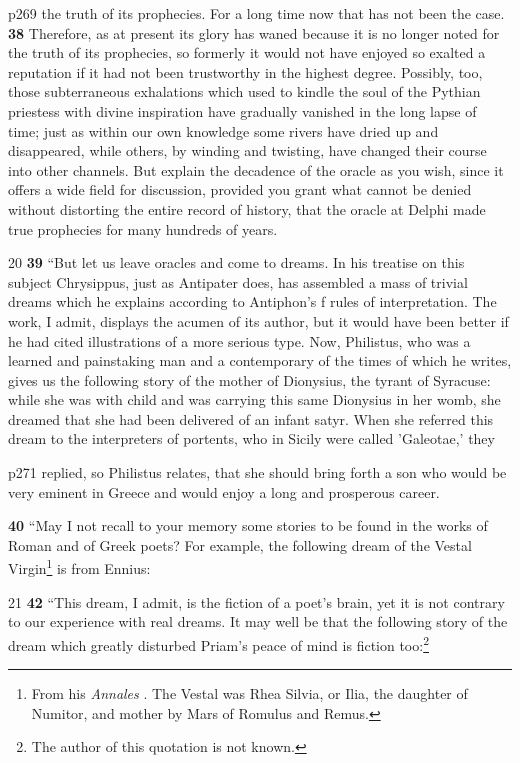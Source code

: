p269 the truth of its prophecies. For a long time now that has not been the case. \textbf{38} Therefore, as at present its glory has waned because it is no longer noted for the truth of its prophecies, so formerly it would not have enjoyed so exalted a reputation if it had not been trustworthy in the highest degree. Possibly, too, those subterraneous exhalations which used to kindle the soul of the Pythian priestess with divine inspiration have gradually vanished in the long lapse of time; just as within our own knowledge some rivers have dried up and disappeared, while others, by winding and twisting, have changed their course into other channels. But explain the decadence of the oracle as you wish, since it offers a wide field for discussion, provided you grant what cannot be denied without distorting the entire record of history, that the oracle at Delphi made true prophecies for many hundreds of years.

20
\textbf{39} ``But let us leave oracles and come to dreams. In his treatise on this subject Chrysippus, just as Antipater does, has assembled a mass of trivial dreams which he explains according to Antiphon's\texthebrew{} f rules of interpretation. The work, I admit, displays the acumen of its author, but it would have been better if he had cited illustrations of a more serious type. Now, Philistus, who was a learned and painstaking man and a contemporary of the times of which he writes, gives us the following story of the mother of Dionysius, the tyrant of Syracuse: while she was with child and was carrying this same Dionysius in her womb, she dreamed that she had been delivered of an infant satyr. When she referred this dream to the interpreters of portents, who in Sicily were called 'Galeotae,' they

p271 replied, so Philistus relates, that she should bring forth a son who would be very eminent in Greece and would enjoy a long and prosperous career.

\textbf{40} ``May I not recall to your memory some stories to be found in the works of Roman and of Greek poets? For example, the following dream of the Vestal Virgin\texthebrew{}\footnote{From his \emph{Annales} . The Vestal was Rhea Silvia, or Ilia, the daughter of Numitor, and mother by Mars of Romulus and Remus.

} is from Ennius:

21
\textbf{42} ``This dream, I admit, is the fiction of a poet's brain, yet it is not contrary to our experience with real dreams. It may well be that the following story of the dream which greatly disturbed Priam's peace of mind is fiction too:\footnote{The author of this quotation is not known.

}

